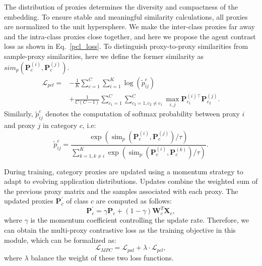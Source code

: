 The distribution of proxies determines the diversity and compactness of the embedding. To ensure stable and meaningful similarity calculations, all proxies are normalized to the unit hypersphere. We make the inter-class proxies far away and the intra-class proxies close together, and here we propose the agent contrast loss as shown in Eq.~\ref{pcl_loss}. To distinguish proxy-to-proxy similarities from sample-proxy similarities, here we define the former similarity as $sim_p(\mathbf{P}_c^{(i)}, \mathbf{P}_c^{(j)})$.
\begin{align}
\label{pcl_loss}
\mathcal{L}_{pcl} = 
& -\frac{1}{K} \sum_{c=1}^C \sum_{i=1}^K \log \left(\tilde{p}_{i j}^c\right) \nonumber \\
& + \frac{1}{C(C-1)} \sum_{c_1=1}^C \sum_{c_2=1, c_2 \neq c_1}^C 
\max _{i, j} \mathbf{P}_{c_1}^{(i) \top} \mathbf{P}_{c_2}^{(j)} .
\end{align}
Similarly, $\tilde{p}_{ij}^c$ denotes the computation of softmax probability between proxy $i$ and proxy $j$ in category $c$, i.e:
\begin{equation}
\tilde{p}_{i j}^c=\frac{\exp \left(\operatorname{sim}_p\left(\mathbf{P}_c^{(i)}, \mathbf{P}_c^{(j)}\right) / \tau\right)}{\sum_{k=1, k \neq i}^K \exp \left(\operatorname{sim}_p\left(\mathbf{P}_c^{(i)}, \mathbf{P}_c^{(k)}\right) / \tau\right)} .
\end{equation}

During training, category proxies are updated using a momentum strategy to adapt to evolving application distributions. Updates combine the weighted sum of the previous proxy matrix and the samples associated with each proxy. The updated proxies $\mathbf{P}_c^{\prime}$ of class $c$ are computed as follows:
\begin{equation}
\mathbf{P}_c^{\prime}=\gamma \mathbf{P}_c+(1-\gamma) \mathbf{W}_c^T \mathbf{X}_c,
\end{equation}
where $\gamma$ is the momentum coefficient controlling the update rate. Therefore, we can obtain the multi-proxy contrastive loss as the training objective in this module, which can be formalized as:
\begin{equation}
\mathcal{L}_{MPC} = \mathcal{L}_{pal} + \lambda \cdot \mathcal{L}_{pcl},
\end{equation}
where $\lambda$ balance the weight of these two loss functions.


